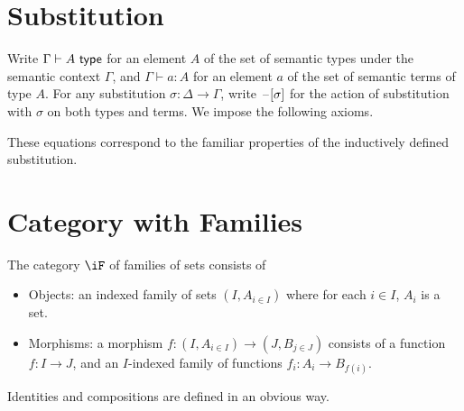 \documentclass{amsart}
\begin{document}
\section{Substitution}
\label{sec:substitution}
Write $\Gamma \vdash A ~\mathsf{type}$ for an element $A$ of the set of semantic types under the semantic context $\Gamma$, and $\Gamma \vdash a : A$ for an element $a$ of the set of semantic terms of type $A$.
For any substitution $\sigma : \Delta \to \Gamma$, write $\mathord{\hspace{1pt}\text{--}\hspace{1pt}}[\sigma]$ for the action of substitution with $\sigma$ on both types and terms.
We impose the following axioms.
These equations correspond to the familiar properties of the inductively defined substitution.

\section{Category with Families}
\label{sec:category-with-families}

\begin{defn}
  The category $\iF$ of families of sets consists of
  \begin{itemize}
  \item Objects: an indexed family of sets $(I, A_{i \in I})$ where for each $i \in I$, $A_{i}$ is a set.
  \item Morphisms: a morphism $f : (I, A_{i \in I}) \to (J, B_{j \in J})$ consists of a function $f : I \to J$, and an $I$-indexed family of functions $f_{i} : A_{i} \to B_{f(i)}$.
  \end{itemize}
  Identities and compositions are defined in an obvious way.
\end{defn}
\end{document}
